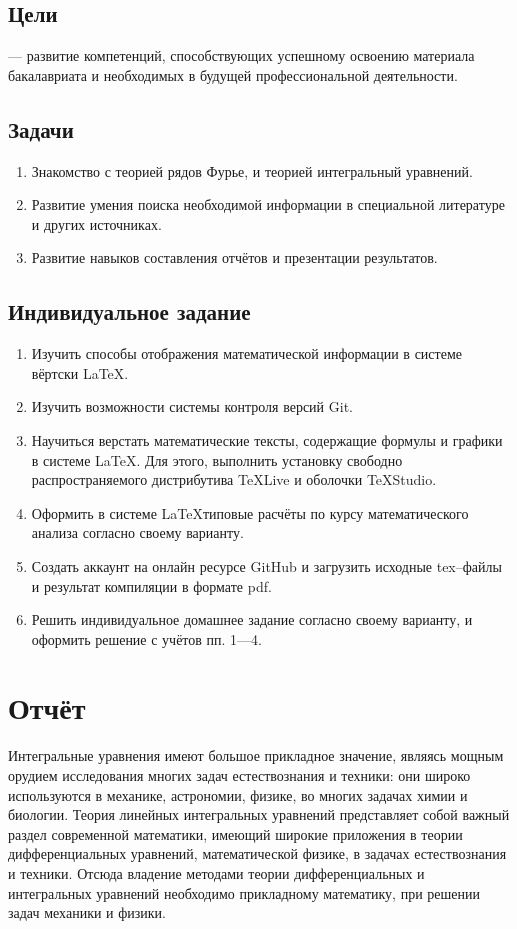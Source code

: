 \documentclass[12pt]{article}
\begin{document}
	\subsection{Цели}
	--- развитие компетенций, способствующих успешному освоению материала бакалавриата и необходимых в будущей профессиональной деятельности.
	
	\subsection{Задачи}
	\begin{enumerate}
		\item Знакомство с теорией рядов Фурье, и теорией интегральный уравнений.
		\item Развитие умения поиска необходимой информации в специальной литературе и других источниках.
		\item Развитие навыков составления отчётов и презентации результатов.
	\end{enumerate}
	
	\subsection{Индивидуальное задание}	
	\begin{enumerate}
		\item Изучить способы отображения математической информации в системе вёртски \LaTeX.
		\item Изучить возможности  системы контроля версий \textsf{Git}.
		\item Научиться верстать математические тексты, содержащие формулы и графики в системе \LaTeX.
		Для этого, выполнить установку свободно распространяемого дистрибутива \textsf{TeXLive} и оболочки \textsf{TeXStudio}.
		\item Оформить в системе \LaTeX типовые расчёты по курсу математического анализа согласно своему варианту.
		\item Создать аккаунт на онлайн ресурсе \textsf{GitHub} и загрузить исходные \textsf{tex}--файлы 
		и результат компиляции в формате \textsf{pdf}.
		\item Решить индивидуальное домашнее задание согласно своему варианту, и оформить решение с учётов пп. 1---4.
	\end{enumerate} 
	
	\newpage
	\section{Отчёт}
	Интегральные уравнения имеют большое прикладное значение, являясь мощным
	орудием исследования многих задач естествознания и техники: они широко используются
	в механике, астрономии, физике, во многих задачах химии и биологии. Теория линейных
	интегральных уравнений представляет собой важный раздел современной математики,
	имеющий широкие приложения в теории дифференциальных уравнений, математической
	физике, в задачах естествознания и техники. Отсюда владение методами теории
	дифференциальных и интегральных уравнений необходимо прикладному математику, при решении задач
	механики и физики.
	
\end{document}
